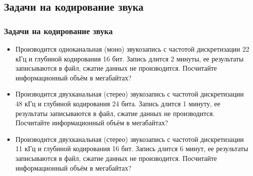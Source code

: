 \documentclass[compress,red]{beamer}
\begin{document}
\subsection{Задачи на кодирование звука}
\begin{frame}[fragile]
  \frametitle{Задачи на кодирование звука}
  \begin{itemize}[<+->]
    \item Производится одноканальная (моно) звукозапись с частотой дискретизации 22 кГц и глубиной кодирования 16 бит. Запись длится 2 минуты, ее результаты записываются в файл, сжатие данных не производится. Посчитайте информационный объём в мегабайтах?
    \item Производится двухканальная (стерео) звукозапись с частотой дискретизации 48 кГц и глубиной кодирования 24 бита. Запись длится 1 минуту, ее результаты записываются в файл, сжатие данных не производится. Посчитайте информационный объём в мегабайтах?
    \item Производится двухканальная (стерео) звукозапись с частотой дискретизации 11 кГц и глубиной кодирования 16 бит. Запись длится 6 минут, ее результаты записываются в файл, сжатие данных не производится. Посчитайте информационный объём в мегабайтах?
  \end{itemize}
\end{frame}
\end{document}
